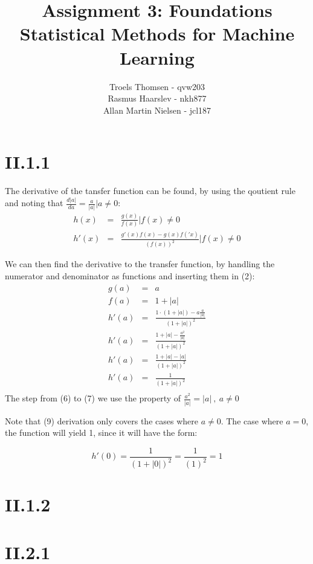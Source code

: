 \documentclass[12pt, a4paper]{article}
\title{Assignment 3: Foundations\\Statistical Methods for Machine Learning}
\author{Troels Thomsen - qvw203\\Rasmus Haarslev - nkh877\\Allan Martin Nielsen - jcl187}
\begin{document}
\pagestyle{empty}
\maketitle
{}
\newpage

\tableofcontents
\newpage

\pagestyle{fancy}

\section*{II.1.1}
The derivative of the tansfer function can be found, by using the qoutient rule and noting that $\frac{d|a|}{da}=\frac{a}{|a|}|a\neq 0$:\\
\begin{eqnarray}
	h(x) &=& \frac{g(x)}{f(x)} | f(x) \neq 0\\
	h'(x) &=& \frac{g'(x)f(x)-g(x)f('x)}{(f(x))^2} | f(x) \neq 0
\end{eqnarray}
 
We can then find the derivative to the transfer function, by handling the numerator and denominator as functions and inserting them in (2):
\begin{eqnarray}
	g(a) &=& a\\
	f(a) &=& 1+|a|\\
	h'(a) &=& \frac{1\cdot (1+|a|)-a\frac{a}{|a|}}{(1+|a|)^2}\\
	h'(a) &=& \frac{1+|a|-\frac{a^2}{|a|}}{(1+|a|)^2}\\
	h'(a) &=& \frac{1+|a|-|a|}{(1+|a|)^2}\\
	h'(a) &=& \frac{1}{(1+|a|)^2}\\
\end{eqnarray}
The step from (6) to (7) we use the property of $\frac{a^2}{|a|} = |a|\ ,\ a\neq 0$


Note that (9) derivation only covers the cases where $a\neq 0$.  
The case where $a=0$, the function will yield 1, since it will have the form:

\begin{equation}
	h'(0) = \frac{1}{(1+|0|)^2} = \frac{1}{(1)^2} = 1
\end{equation}

\section*{II.1.2}
\section*{II.2.1}
\end{document}

